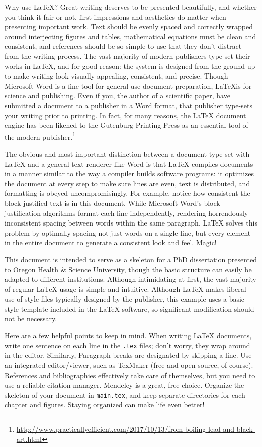 Why use \LaTeX?
Great writing deserves to be presented beautifully, and whether you think it fair or not, first impressions and aesthetics do matter when presenting important work.
Text should be evenly spaced and correctly wrapped around interjecting figures and tables, mathematical equations must be clean and consistent, and references should be so simple to use that they don't distract from the writing process.
The vast majority of modern publishers type-set their works in \LaTeX, and for good reason: the system is designed from the ground up to make writing look visually appealing, consistent, and precise.
Though Microsoft Word is a fine tool for general use document preparation, \LaTeX is for science and publishing. 
Even if you, the author of a scientific paper, have submitted a document to a publisher in a Word format, that publisher type-sets your writing prior to printing. 
In fact, for many reasons, the LaTeX  document engine has been likened to the Gutenburg Printing Press as an essential tool of the modern publisher.\footnote{\url{http://www.practicallyefficient.com/2017/10/13/from-boiling-lead-and-black-art.html}}

The obvious and most important distinction between a document type-set with LaTeX and a general text renderer like Word is that LaTeX compiles documents in a manner similar to the way a compiler builds software programs: it optimizes the document at every step to make sure lines are even, text is distributed, and formatting is obeyed uncompromisingly.
For example, notice how consistent the block-justified text is in this document. 
While Microsoft Word's block justification algorithms format each line independently, rendering horrendously inconsistent spacing between words within the same paragraph, LaTeX solves this problem by optimally spacing not just words on a single line, but every element in the entire document to generate a consistent look and feel.
Magic!

This document is intended to serve as a skeleton for a PhD dissertation presented to Oregon Health \& Science University, though the basic structure can easily be adapted to different institutions.
Although intimidating at first, the vast majority of regular LaTeX usage is simple and intuitive. 
Although LaTeX makes liberal use of style-files typically designed by the publisher, this example uses a basic style template included in the LaTeX software, so significant modification should not be necessary.

Here are a few helpful points to keep in mind. 
When writing LaTeX documents, write one sentence on each line in the \texttt{.tex} files; don't worry, they wrap around in the editor. 
Similarly, Paragraph breaks are designated by skipping a line.
Use an integrated editor/viewer, such as TexMaker (free and open-source, of course).
References and bibliographies effectively take care of themselves, but you need to use a reliable citation manager. Mendeley is a great, free choice.
Organize the skeleton of your document in \texttt{main.tex}, and keep separate directories for each chapter and figures. 
Staying organized can make life even better!

